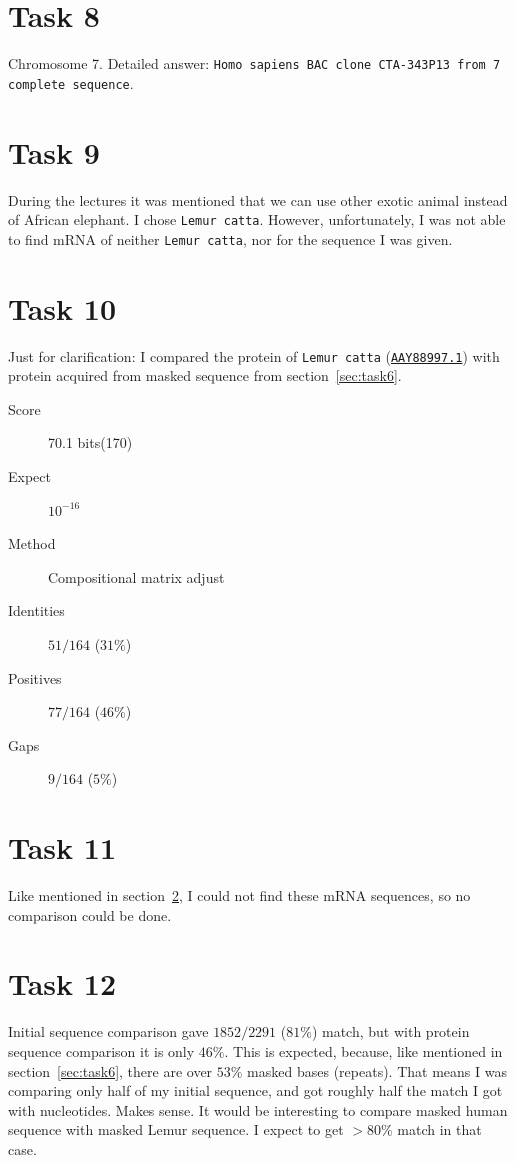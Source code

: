 \documentclass[english,11pt]{article}
\begin{document}
\section{Task 8}
Chromosome 7. Detailed answer: \texttt{Homo sapiens BAC clone CTA-343P13 from
7 complete sequence}.

\section{Task 9}
\label{sec:task9}
During the lectures it was mentioned that we can use other exotic animal instead
of African elephant. I chose \texttt{Lemur catta}. However, unfortunately, I was
not able to find mRNA of neither \texttt{Lemur catta}, nor for the sequence I
was given.

\section{Task 10}
Just for clarification: I compared the protein of \texttt{Lemur catta}
(\href{http://www.ncbi.nlm.nih.gov/protein/AAY88997.1}{\texttt{AAY88997.1}}) with
protein acquired from masked sequence from section~\ref{sec:task6}.

\begin{description}
    \item[Score] 70.1 bits(170)
    \item[Expect] $10^{-16}$
    \item[Method] Compositional matrix adjust
    \item[Identities] $51/164$ ($31\%$)
    \item[Positives] $77/164$ ($46\%$)
    \item[Gaps] $9/164$ ($5\%$)
\end{description}

\section{Task 11}
Like mentioned in section~\ref{sec:task9}, I could not find these mRNA
sequences, so no comparison could be done.

\section{Task 12}
Initial sequence comparison gave $1852/2291$ ($81\%$) match, but with protein
sequence comparison it is only $46\%$. This is expected, because, like mentioned
in section~\ref{sec:task6}, there are over $53\%$ masked bases (repeats). That
means I was comparing only half of my initial sequence, and got roughly half the
match I got with nucleotides. Makes sense. It would be interesting to compare
masked human sequence with masked Lemur sequence. I expect to get $>80\%$ match
in that case.
\end{document}

